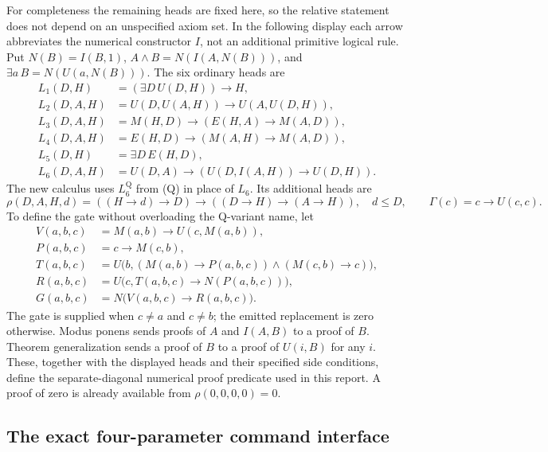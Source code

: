 For completeness the remaining heads are fixed here, so the relative
statement does not depend on an unspecified axiom set. In the following
display each arrow abbreviates the numerical constructor $I$, not an
additional primitive logical rule. Put
$N(B)=I(B,1)$, $A\wedge B=N(I(A,N(B)))$, and
$\exists a\,B=N(U(a,N(B)))$. The six ordinary heads are
\[
\begin{aligned}
L_1(D,H)&=(\exists D\,U(D,H))\to H,\\
L_2(D,A,H)&=U(D,U(A,H))\to U(A,U(D,H)),\\
L_3(D,A,H)&=M(H,D)\to(E(H,A)\to M(A,D)),\\
L_4(D,A,H)&=E(H,D)\to(M(A,H)\to M(A,D)),\\
L_5(D,H)&=\exists D\,E(H,D),\\
L_6(D,A,H)&=U(D,A)\to(U(D,I(A,H))\to U(D,H)).
\end{aligned}
\]
The new calculus uses $L_6^{\mathrm Q}$ from (Q) in place of $L_6$.
Its additional heads are
\[
 \rho(D,A,H,d)=((H\to d)\to D)\to((D\to H)\to(A\to H)),
 \quad d\leq D,
 \qquad \Gamma(c)=c\to U(c,c).
\]
To define the gate without overloading the Q-variant name, let
\[
\begin{aligned}
 V(a,b,c)&=M(a,b)\to U(c,M(a,b)),\\
 P(a,b,c)&=c\to M(c,b),\\
 T(a,b,c)&=U\bigl(b,(M(a,b)\to P(a,b,c))\wedge(M(c,b)\to c)\bigr),\\
 R(a,b,c)&=U\bigl(c,T(a,b,c)\to N(P(a,b,c))\bigr),\\
 G(a,b,c)&=N\bigl(V(a,b,c)\to R(a,b,c)\bigr).
\end{aligned}
\]
The gate is supplied when $c\ne a$ and $c\ne b$; the emitted replacement
is zero otherwise. Modus ponens sends proofs of $A$ and $I(A,B)$ to a
proof of $B$. Theorem generalization sends a proof of $B$ to a proof of
$U(i,B)$ for any $i$. These, together with the displayed heads and their
specified side conditions, define the separate-diagonal numerical proof
predicate used in this report. A proof of zero is already available from
$\rho(0,0,0,0)=0$.

\subsection{The exact four-parameter command interface}

